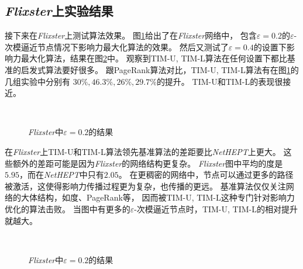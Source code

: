 \subsection{{\em Flixster}上实验结果}

接下来在{\em Flixster}上测试算法效果。
图\ref{fig:Flixster_2}给出了在{\em Flixster}网络中，
包含$\varepsilon=0.2$的$\varepsilon$-次模逼近节点情况下影响力最大化算法的效果。
然后又测试了$\varepsilon=0.4$的设置下影响力最大化算法，结果在图\ref{fig:Flixster_4}中。
观察到{\sf TIM-U, TIM-L}算法在任何设置下都比基准的启发式算法要好很多。
跟{\sf PageRank}算法对比，{\sf TIM-U, TIM-L}算法有在图\ref{fig:Flixster_2}的几组实验中分别有
$30\%,46.3\%,26\%,29.7\%$的提升。
{\sf TIM-U}和{\sf TIM-L}的表现很接近。


\begin{figure}[h]
\centering
	\\
	\caption{{\em Flixster}中$\varepsilon=0.2$的结果}
	\label{fig:Flixster_2}
\end{figure}

在{\em Flixster}上{\sf TIM-U}和{\sf TIM-L}算法领先基准算法的差距要比{\em NetHEPT}上更大。
这些额外的差距可能是因为{\em Flixster}的网络结构更复杂。
{\em Flixster}图中平均的度是 $5.95$，而在{\em NetHEPT}中只有$2.05$。
在更稠密的网络中，节点可以通过更多的路径被激活，这使得影响力传播过程更为复杂，也传播的更远。
基准算法仅仅关注网络的大体结构，如度、PageRank等，
因而被{\sf TIM-U, TIM-L}这种专门针对影响力优化的算法击败。
当图中有更多的$\varepsilon$-次模逼近节点时，{\sf TIM-U, TIM-L}的相对提升就越大。


\begin{figure}[h]
\centering
	\\
	\caption{{\em Flixster}中$\varepsilon=0.2$的结果}
	\label{fig:Flixster_4}
\end{figure}

